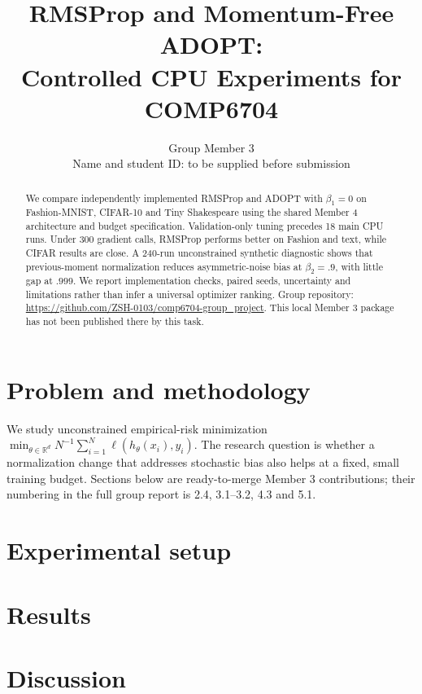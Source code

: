 \documentclass{article}
\title{RMSProp and Momentum-Free ADOPT:\\Controlled CPU Experiments for COMP6704}
\author{Group Member 3\\Name and student ID: to be supplied before submission}
\begin{document}
\maketitle
\begin{abstract}
We compare independently implemented RMSProp and ADOPT with $\beta_1=0$ on Fashion-MNIST,
CIFAR-10 and Tiny Shakespeare using the shared Member 4 architecture and budget specification.
Validation-only tuning precedes 18 main CPU runs. Under 300 gradient calls, RMSProp performs
better on Fashion and text, while CIFAR results are close. A 240-run unconstrained synthetic
diagnostic shows that previous-moment normalization reduces asymmetric-noise bias at
$\beta_2=.9$, with little gap at $.999$. We report implementation checks, paired seeds,
uncertainty and limitations rather than infer a universal optimizer ranking.
Group repository: \url{https://github.com/ZSH-0103/comp6704-group_project}.
This local Member 3 package has not been published there by this task.
\end{abstract}
\section{Problem and methodology}
We study unconstrained empirical-risk minimization
$\min_{\theta\in\mathbb R^d}N^{-1}\sum_{i=1}^N\ell(h_\theta(x_i),y_i)$.
The research question is whether a normalization change that addresses stochastic bias
also helps at a fixed, small training budget. Sections below are ready-to-merge Member 3
contributions; their numbering in the full group report is 2.4, 3.1--3.2, 4.3 and 5.1.

\section{Experimental setup}

\section{Results}

\section{Discussion}

\end{document}
